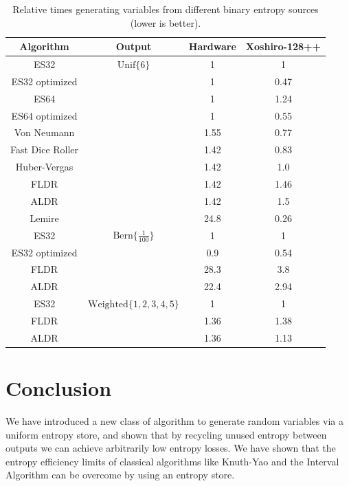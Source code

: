 \documentclass[12pt]{article}
\newcommand{\unif}[1]{\mathrm{Unif}\{#1\}}
\newcommand{\bern}[1]{\mathrm{Bern}\{#1\}}
\begin{document}
\begin{table}[h!]
\centering
\begin{tabular}{|c|c|c|c|}
\hline
Algorithm & Output & Hardware & Xoshiro-128++ \\
\hline
ES32                  & $\unif{6}$ & 1 & 1 \\
ES32 optimized        &  & 1 & 0.47 \\
ES64                  & & 1 & 1.24 \\
ES64 optimized        &  & 1 & 0.55 \\
Von Neumann \cite{neumann51}     &  & 1.55 & 0.77 \\
Fast Dice Roller \cite{lumbroso2013optimal} &  & 1.42 & 0.83 \\
Huber-Vergas \cite{huber2024optimalrollingfairdice} &  & 1.42 & 1.0 \\
FLDR \cite{saad2020fldr} &  & 1.42 & 1.46 \\
ALDR \cite{saad2025} &  & 1.42 & 1.5 \\
Lemire \cite{lemire2019fast} & & 24.8 & 0.26 \\
\hline

ES32                  & $\bern{\frac{1}{100}}$ & 1 & 1 \\
ES32 optimized        &  & 0.9 & 0.54 \\
FLDR                  &  & 28.3 & 3.8 \\
ALDR                  &  & 22.4 & 2.94 \\

\hline

ES32                  & $\mathrm{Weighted}\{1,2,3,4,5\}$ & 1 & 1 \\
FLDR                  &  & 1.36 & 1.38 \\
ALDR                  & & 1.36 & 1.13 \\

\hline

\end{tabular}
\caption{Relative times generating variables from different binary entropy sources (lower is better).}
    \label{tab:speed}
\end{table}



\section{Conclusion}

We have introduced a new class of algorithm to generate random variables via a uniform entropy store, and shown that by recycling unused entropy between outputs we can achieve arbitrarily low entropy losses. We have shown that the entropy efficiency limits of classical algorithms like Knuth-Yao \cite{Knuth1976TheCO} and the Interval Algorithm \cite{han97} can be overcome by using an entropy store. 
\end{document}
